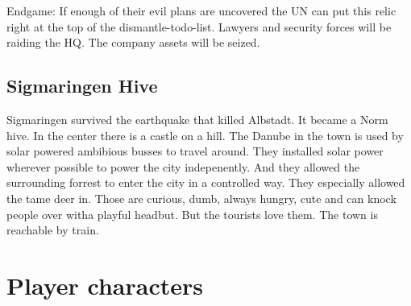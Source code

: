 Endgame: If enough of their evil plans are uncovered the UN can put this relic right at the top of the dismantle-todo-list. Lawyers and security forces will be raiding the HQ. The company assets will be seized.

\subsection{Sigmaringen Hive}

Sigmaringen survived the earthquake that killed Albstadt. It became a Norm hive. In the center there is a castle on a hill. The Danube in the town is used by solar powered ambibious busses to travel around. They installed solar power wherever possible to power the city indepenently. And they allowed the surrounding forrest to enter the city in a controlled way. They especially allowed the tame deer in. Those are curious, dumb, always hungry, cute and can knock people over witha  playful headbut. But the tourists love them.
The town is reachable by train.



\section{Player characters}

